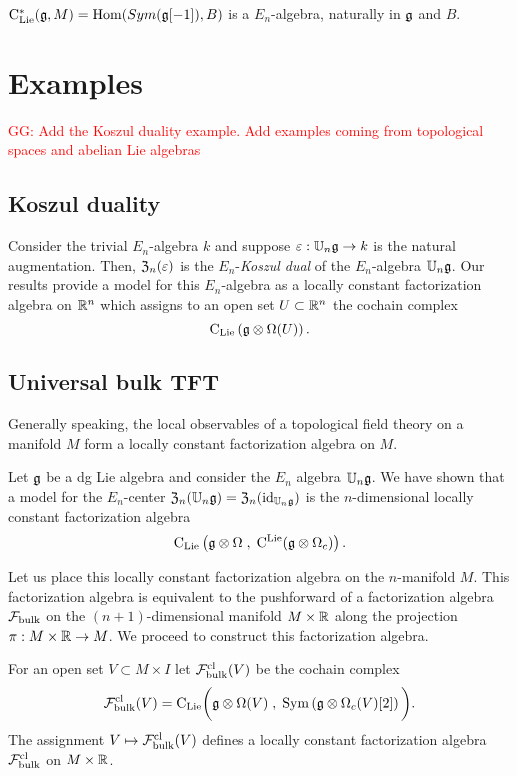 \documentclass[11pt]{amsart}
\numberwithin{equation}{section}
\def\greg{\textcolor{red}{GG: }\textcolor{red}}
\begin{document}
\begin{lmm}
 ${\rm C}_{\rm Lie}^*(\mathfrak g, M) = {\rm Hom} (Sym(\mathfrak g[-1]), B)$ is a $E_n$-algebra, naturally in $\mathfrak g$ and $B$.
\end{lmm}



\section{Examples}


\greg{Add the Koszul duality example. Add examples coming from topological spaces and abelian Lie algebras}

\subsection{Koszul duality}
\label{sec: Koszul}

Consider the trivial $E_n$-algebra $k$ and suppose $\varepsilon : \mathbb U_n \mathfrak g \to k$ is the natural augmentation. 
Then, ${\frak Z}_n (\varepsilon)$ is the $E_n$-{\em Koszul dual} of the $E_n$-algebra $\mathbb U_n \mathfrak g$. 
Our results provide a model for this $E_n$-algebra as a locally constant factorization algebra on $\mathbb R^n$ which assigns to an open set $U \subset \mathbb R^n$ the cochain complex
\[
{\rm C}_{{\rm Lie}} \left(\mathfrak g \otimes \Omega(U) \right) .
\]

\subsection{Universal bulk TFT}
\label{sec: TFT}

Generally speaking, the local observables of a topological field theory on a manifold $M$ form a locally constant factorization algebra on $M$. 

Let $\mathfrak g$ be a dg Lie algebra and consider the $E_n$ algebra $\mathbb U_n \mathfrak g$. 
We have shown that a model for the $E_n$-center ${\frak Z}_n (\mathbb U_n \mathfrak g) = {\frak Z}_n ({\rm id}_{\mathbb U_n \mathfrak g})$ is the $n$-dimensional locally constant factorization algebra 
\[
{\rm C}_{{\rm Lie}} \left( \mathfrak g \otimes \Omega \; , \; {\rm C}^{\rm Lie} (\mathfrak g \otimes \Omega_c) \right)  .
\]

Let us place this locally constant factorization algebra on the $n$-manifold $M$.
This factorization algebra is equivalent to the pushforward of a factorization algebra $\mathcal F_{\rm bulk}$ on the $(n+1)$-dimensional manifold $M \times \mathbb R$ along the projection $\pi : M \times \mathbb R \to M$. 
We proceed to construct this factorization algebra. 

For an open set $V \subset M \times I$ let $\mathcal F^{\rm cl}_{\rm bulk} (V)$ be the cochain complex 
\[
\mathcal F^{\rm cl}_{\rm bulk} (V) = {\rm C}_{{\rm Lie}} \bigg(\mathfrak g \otimes \Omega (V) \; , \; {\rm Sym} \left(\mathfrak g \otimes \Omega_c(V) [2] \right) \bigg) .
\]
The assignment $V \mapsto \mathcal F^{\rm cl}_{\rm bulk}(V)$ defines a locally constant factorization algebra $\mathcal F^{\rm cl}_{\rm bulk}$ on $M \times \mathbb R$. 
\end{document}
